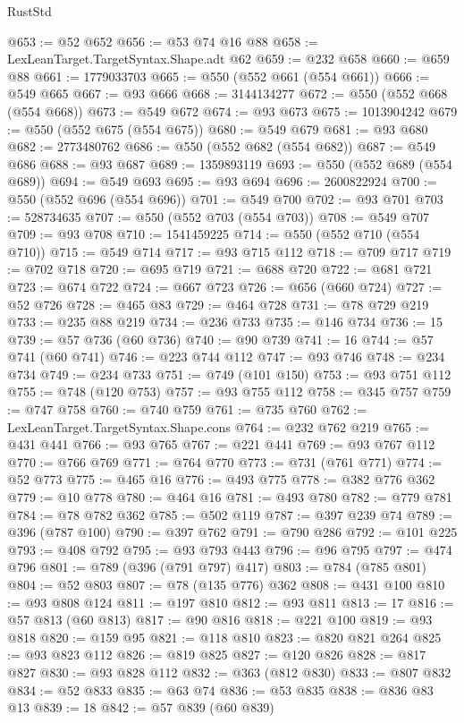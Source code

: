 \begin{lexlean}{RustStd}
\begin{coremodule}
@653 := @52 @652
@656 := @53 @74 @16 @88
@658 := LexLeanTarget.TargetSyntax.Shape.adt @62
@659 := @232 @658
@660 := @659 @88
@661 := 1779033703
@665 := @550 (@552 @661 (@554 @661))
@666 := @549 @665
@667 := @93 @666
@668 := 3144134277
@672 := @550 (@552 @668 (@554 @668))
@673 := @549 @672
@674 := @93 @673
@675 := 1013904242
@679 := @550 (@552 @675 (@554 @675))
@680 := @549 @679
@681 := @93 @680
@682 := 2773480762
@686 := @550 (@552 @682 (@554 @682))
@687 := @549 @686
@688 := @93 @687
@689 := 1359893119
@693 := @550 (@552 @689 (@554 @689))
@694 := @549 @693
@695 := @93 @694
@696 := 2600822924
@700 := @550 (@552 @696 (@554 @696))
@701 := @549 @700
@702 := @93 @701
@703 := 528734635
@707 := @550 (@552 @703 (@554 @703))
@708 := @549 @707
@709 := @93 @708
@710 := 1541459225
@714 := @550 (@552 @710 (@554 @710))
@715 := @549 @714
@717 := @93 @715 @112
@718 := @709 @717
@719 := @702 @718
@720 := @695 @719
@721 := @688 @720
@722 := @681 @721
@723 := @674 @722
@724 := @667 @723
@726 := @656 (@660 @724)
@727 := @52 @726
@728 := @465 @83
@729 := @464 @728
@731 := @78 @729 @219
@733 := @235 @88 @219
@734 := @236 @733
@735 := @146 @734
@736 := 15
@739 := @57 @736 (@60 @736)
@740 := @90 @739
@741 := 16
@744 := @57 @741 (@60 @741)
@746 := @223 @744 @112
@747 := @93 @746
@748 := @234 @734
@749 := @234 @733
@751 := @749 (@101 @150)
@753 := @93 @751 @112
@755 := @748 (@120 @753)
@757 := @93 @755 @112
@758 := @345 @757
@759 := @747 @758
@760 := @740 @759
@761 := @735 @760
@762 := LexLeanTarget.TargetSyntax.Shape.cons
@764 := @232 @762 @219
@765 := @431 @441
@766 := @93 @765
@767 := @221 @441
@769 := @93 @767 @112
@770 := @766 @769
@771 := @764 @770
@773 := @731 (@761 @771)
@774 := @52 @773
@775 := @465 @16
@776 := @493 @775
@778 := @382 @776 @362
@779 := @10 @778
@780 := @464 @16
@781 := @493 @780
@782 := @779 @781
@784 := @78 @782 @362
@785 := @502 @119
@787 := @397 @239 @74
@789 := @396 (@787 @100)
@790 := @397 @762
@791 := @790 @286
@792 := @101 @225
@793 := @408 @792
@795 := @93 @793 @443
@796 := @96 @795
@797 := @474 @796
@801 := @789 (@396 (@791 @797) @417)
@803 := @784 (@785 @801)
@804 := @52 @803
@807 := @78 (@135 @776) @362
@808 := @431 @100
@810 := @93 @808 @124
@811 := @197 @810
@812 := @93 @811
@813 := 17
@816 := @57 @813 (@60 @813)
@817 := @90 @816
@818 := @221 @100
@819 := @93 @818
@820 := @159 @95
@821 := @118 @810
@823 := @820 @821 @264
@825 := @93 @823 @112
@826 := @819 @825
@827 := @120 @826
@828 := @817 @827
@830 := @93 @828 @112
@832 := @363 (@812 @830)
@833 := @807 @832
@834 := @52 @833
@835 := @63 @74
@836 := @53 @835
@838 := @836 @83 @13
@839 := 18
@842 := @57 @839 (@60 @839)

\end{coremodule}
\end{lexlean}
